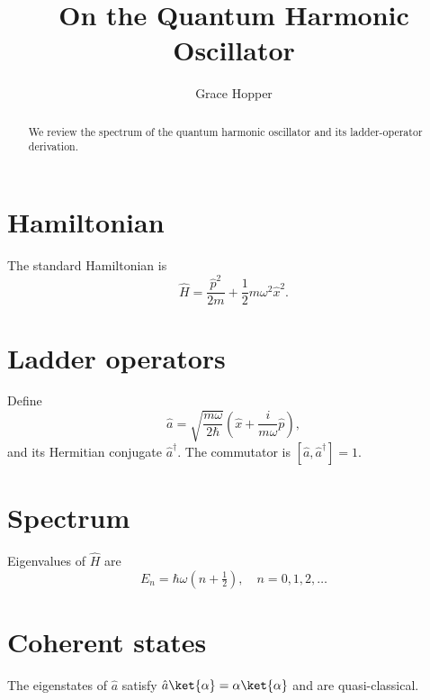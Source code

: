 \documentclass[11pt,a4paper]{article}
\title{On the Quantum Harmonic Oscillator}
\author{Grace Hopper}
\begin{document}
\maketitle

\begin{abstract}
We review the spectrum of the quantum harmonic oscillator and its ladder-operator derivation.
\end{abstract}

\section{Hamiltonian}
The standard Hamiltonian is
\begin{equation}
  \hat H = \frac{\hat p^2}{2m} + \frac{1}{2} m \omega^2 \hat x^2.
\end{equation}

\section{Ladder operators}
Define
\[
  \hat a = \sqrt{\frac{m\omega}{2\hbar}} \left( \hat x + \frac{i}{m\omega} \hat p \right),
\]
and its Hermitian conjugate $\hat a^\dagger$. The commutator is $[\hat a, \hat a^\dagger] = 1$.

\section{Spectrum}
Eigenvalues of $\hat H$ are
\begin{equation}
  E_n = \hbar\omega\left(n + \tfrac{1}{2}\right), \quad n = 0, 1, 2, \ldots
\end{equation}

\section{Coherent states}
The eigenstates of $\hat a$ satisfy $\hat a \ket{\alpha} = \alpha \ket{\alpha}$ and are quasi-classical.
\end{document}
